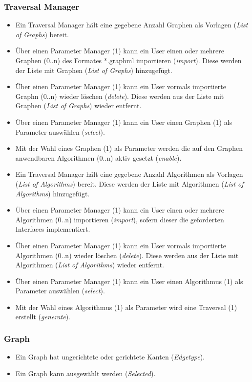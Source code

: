 \subsubsection{Traversal Manager}
\label{subsubsec:Traversal Manager}
\begin{itemize}
  \item Ein Traversal Manager h\"alt eine gegebene Anzahl Graphen als Vorlagen (\textit{List of Graphs}) bereit.
  \item \"Uber einen Parameter Manager (1) kann ein User einen oder mehrere Graphen (0..n) des Formates *.graphml importieren (\textit{import}). Diese werden der Liste mit Graphen (\textit{List of Graphs}) hinzugef\"ugt.
  \item \"Uber einen Parameter Manager (1) kann ein User vormals importierte Graphn (0..n) wieder l\"oschen (\textit{delete}). Diese werden aus der Liste mit Graphen (\textit{List of Graphs}) wieder entfernt.
  \item \"Uber einen Parameter Manager (1) kann ein User einen Graphen (1) als Parameter ausw\"ahlen (\textit{select}).
  \item Mit der Wahl eines Graphen (1) als Parameter werden die auf den Graphen anwendbaren Algorithmen (0..n) aktiv gesetzt (\textit{enable}).
  \item Ein Traversal Manager h\"alt eine gegebene Anzahl Algorithmen als Vorlagen (\textit{List of Algorithms}) bereit. Diese werden der Liste mit Algorithmen (\textit{List of Algorithms}) hinzugef\"ugt.
  \item \"Uber einen Parameter Manager (1) kann ein User einen oder mehrere Algorithmen (0..n) importieren (\textit{import}), sofern dieser die geforderten Interfaces implementiert.
  \item \"Uber einen Parameter Manager (1) kann ein User vormals importierte Algorithmen (0..n) wieder l\"oschen (\textit{delete}). Diese werden aus der Liste mit Algorithmen (\textit{List of Algorithms}) wieder entfernt.
  \item \"Uber einen Parameter Manager (1) kann ein User einen Algorithmus (1) als Parameter ausw\"ahlen (\textit{select}).
  \item Mit der Wahl eines Algorithmus (1) als Parameter wird eine Traversal (1) erstellt (\textit{generate}).
\end{itemize}
% 
\subsubsection{Graph}
\label{subsubsec:Graph}
\begin{itemize}
  \item Ein Graph hat ungerichtete oder gerichtete Kanten (\textit{Edgetype}).
  \item Ein Graph kann ausgew\"ahlt werden (\textit{Selected}).
\end{itemize}
% 
